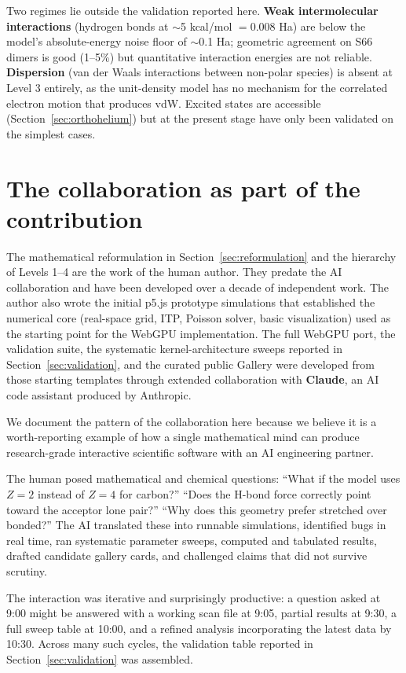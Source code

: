\documentclass[11pt]{article}
\begin{document}
Two regimes lie outside the validation reported here. \textbf{Weak intermolecular interactions} (hydrogen bonds at $\sim$5 kcal/mol $= 0.008$ Ha) are below the model's absolute-energy noise floor of $\sim$0.1 Ha; geometric agreement on S66 dimers is good (1--5\%) but quantitative interaction energies are not reliable. \textbf{Dispersion} (van der Waals interactions between non-polar species) is absent at Level 3 entirely, as the unit-density model has no mechanism for the correlated electron motion that produces vdW. Excited states are accessible (Section~\ref{sec:orthohelium}) but at the present stage have only been validated on the simplest cases.

\section{The collaboration as part of the contribution}\label{sec:collaboration}

The mathematical reformulation in Section~\ref{sec:reformulation} and the hierarchy of Levels 1--4 are the work of the human author. They predate the AI collaboration and have been developed over a decade of independent work. The author also wrote the initial p5.js prototype simulations that established the numerical core (real-space grid, ITP, Poisson solver, basic visualization) used as the starting point for the WebGPU implementation. The full WebGPU port, the validation suite, the systematic kernel-architecture sweeps reported in Section~\ref{sec:validation}, and the curated public Gallery were developed from those starting templates through extended collaboration with \textbf{Claude}, an AI code assistant produced by Anthropic.

We document the pattern of the collaboration here because we believe it is a worth-reporting example of how a single mathematical mind can produce research-grade interactive scientific software with an AI engineering partner.

The human posed mathematical and chemical questions: ``What if the model uses $Z=2$ instead of $Z=4$ for carbon?'' ``Does the H-bond force correctly point toward the acceptor lone pair?'' ``Why does this geometry prefer stretched over bonded?'' The AI translated these into runnable simulations, identified bugs in real time, ran systematic parameter sweeps, computed and tabulated results, drafted candidate gallery cards, and challenged claims that did not survive scrutiny.

The interaction was iterative and surprisingly productive: a question asked at 9:00 might be answered with a working scan file at 9:05, partial results at 9:30, a full sweep table at 10:00, and a refined analysis incorporating the latest data by 10:30. Across many such cycles, the validation table reported in Section~\ref{sec:validation} was assembled.
\end{document}
